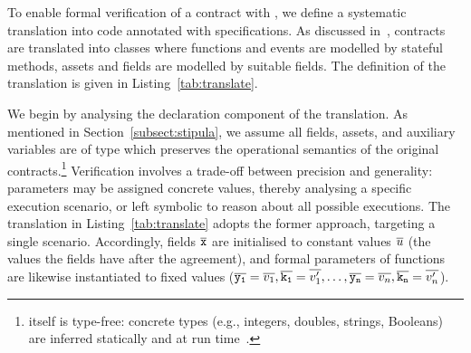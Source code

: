 
To enable formal verification of a {\Stipula} contract with {\KeY}, we
define a systematic translation into {\Java} code annotated with
{\JML} specifications. As discussed in~\cite{iFM25}, {\Stipula}
contracts are translated into classes where functions and events are
modelled by stateful {\Java} methods, assets and fields are modelled
by suitable {\Java} fields.  The definition of the translation is
given in Listing~\ref{tab:translate}.

We begin by analysing the declaration component of the translation.
As mentioned in Section~\ref{subsect:stipula}, we assume all {\Stipula}
fields, assets, and auxiliary variables are of type  which
preserves the operational semantics of the original
contracts.\footnote{{\Stipula} itself is type-free: concrete types
  (e.g., integers, doubles, strings, Booleans) are inferred statically
  and at run time~\cite{CrafaLSV23}.}
%
Verification involves a trade-off between precision and generality:
parameters may be assigned concrete values, thereby analysing a
specific execution scenario, or left symbolic to reason about all
possible executions.  The translation in Listing~\ref{tab:translate}
adopts the former approach, targeting a single scenario.
%
Accordingly, fields $\overline{{\tt x}}$ are initialised to constant
values $\overline{u}$ (the values the fields have after the agreement),
and formal parameters of functions are likewise instantiated to fixed
values
($\overline{\tt y_1} = \overline{v_1}, \overline{\tt k_1} = \overline{v_1'}, \ldots,
\overline{\tt y_n} = \overline{v_n}, \overline{\tt k_n} = \overline{v_n'}$).


